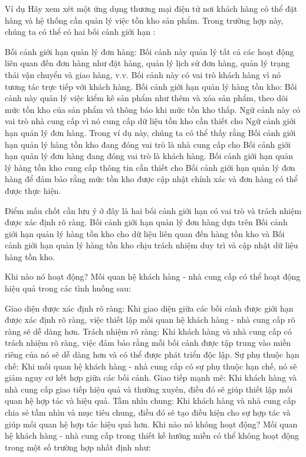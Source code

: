 Ví dụ
Hãy xem xét một ứng dụng thương mại điện tử nơi khách hàng có thể đặt hàng và hệ thống cần quản lý việc tồn kho sản phẩm. Trong trường hợp này, chúng ta có thể có hai bối cảnh giới hạn :

Bối cảnh giới hạn quản lý đơn hàng: Bối cảnh này quản lý tất cả các hoạt động liên quan đến đơn hàng như đặt hàng, quản lý lịch sử đơn hàng, quản lý trạng thái vận chuyển và giao hàng, v.v. Bối cảnh này có vai trò khách hàng vì nó tương tác trực tiếp với khách hàng.
Bối cảnh giới hạn quản lý hàng tồn kho: Bối cảnh này quản lý việc kiểm kê sản phẩm như thêm và xóa sản phẩm, theo dõi mức tồn kho của sản phẩm và thông báo khi mức tồn kho thấp. Ngữ cảnh này có vai trò nhà cung cấp vì nó cung cấp dữ liệu tồn kho cần thiết cho Ngữ cảnh giới hạn quản lý đơn hàng.
Trong ví dụ này, chúng ta có thể thấy rằng Bối cảnh giới hạn quản lý hàng tồn kho đang đóng vai trò là nhà cung cấp cho Bối cảnh giới hạn quản lý đơn hàng đang đóng vai trò là khách hàng. Bối cảnh giới hạn quản lý hàng tồn kho cung cấp thông tin cần thiết cho Bối cảnh giới hạn quản lý đơn hàng để đảm bảo rằng mức tồn kho được cập nhật chính xác và đơn hàng có thể được thực hiện.

Điểm mấu chốt cần lưu ý ở đây là hai bối cảnh giới hạn có vai trò và trách nhiệm được xác định rõ ràng. Bối cảnh giới hạn quản lý đơn hàng dựa trên Bối cảnh giới hạn quản lý hàng tồn kho cho dữ liệu liên quan đến hàng tồn kho và Bối cảnh giới hạn quản lý hàng tồn kho chịu trách nhiệm duy trì và cập nhật dữ liệu hàng tồn kho.

Khi nào nó hoạt động?
Mối quan hệ khách hàng - nhà cung cấp có thể hoạt động hiệu quả trong các tình huống sau:

Giao diện được xác định rõ ràng: Khi giao diện giữa các bối cảnh được giới hạn được xác định rõ ràng, việc thiết lập mối quan hệ khách hàng - nhà cung cấp rõ ràng sẽ dễ dàng hơn.
Trách nhiệm rõ ràng: Khi khách hàng và nhà cung cấp có trách nhiệm rõ ràng, việc đảm bảo rằng mỗi bối cảnh được tập trung vào miền riêng của nó sẽ dễ dàng hơn và có thể được phát triển độc lập.
Sự phụ thuộc hạn chế: Khi mối quan hệ khách hàng - nhà cung cấp có sự phụ thuộc hạn chế, nó sẽ giảm nguy cơ kết hợp giữa các bối cảnh.
Giao tiếp mạnh mẽ: Khi khách hàng và nhà cung cấp giao tiếp hiệu quả và thường xuyên, điều đó sẽ giúp thiết lập mối quan hệ hợp tác và hiệu quả.
Tầm nhìn chung: Khi khách hàng và nhà cung cấp chia sẻ tầm nhìn và mục tiêu chung, điều đó sẽ tạo điều kiện cho sự hợp tác và giúp mối quan hệ hợp tác hiệu quả hơn.
Khi nào nó không hoạt động?
Mối quan hệ khách hàng - nhà cung cấp trong thiết kế hướng miền có thể không hoạt động trong một số trường hợp nhất định như:

